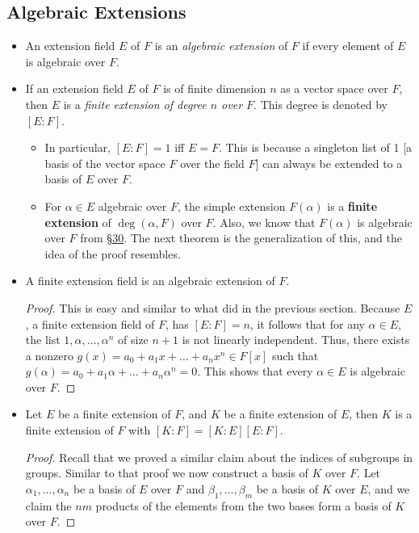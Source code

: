 \documentclass[11pt]{article}
\newcommand{\lk}[2]{\hyperlink{subsection.#1.#2}{\S#2}} %
\newcommand{\df}[1]{\textit{\textsf{#1}}}
\begin{document}
\subsection{Algebraic Extensions}
\begin{itemize}
    \item An extension field $E$ of $F$ is an \df{algebraic extension} of $F$ if every element of $E$ is algebraic over $F$.
    \item If an extension field $E$ of $F$ is of finite dimension $n$ as a vector space over $F$, then $E$ is a \df{finite extension of degree $n$ over $F$}. This degree is denoted by $[E:F]$.
    \begin{itemize}
         \item In particular, $[E:F] = 1$ iff $E = F$. This is because a singleton list of 1 [a basis of the vector space $F$ over the field $F$] can always be extended to a basis of $E$ over $F$.
        \item For $\alpha \in E$ algebraic over $F$, the simple extension $F(\alpha)$ is a \textbf{finite extension} of $\deg(\alpha,F)$ over $F$. Also, we know that $F(\alpha)$ is algebraic over $F$ from \lk{6}{30}. The next theorem is the generalization of this, and the idea of the proof resembles.
    \end{itemize}
    \item A finite extension field is an algebraic extension of $F$.
    \begin{proof}
        This is easy and similar to what did in the previous section. Because $E$, a finite extension field of $F$, has $[E:F] = n$, it follows that for any $\alpha \in E$, the list $1, \alpha, \dots, \alpha^n$ of size $n+1$ is not linearly independent. Thus, there exists a nonzero $g(x) = a_0 + a_1 x+ \dots + a_n x^n \in F[x]$ such that $g(\alpha) = a_0 + a_1 \alpha + \dots +a_n \alpha^n = 0$. This shows that every $\alpha \in E$ is algebraic over $F$.
    \end{proof}
    \item Let $E$ be a finite extension of $F$, and $K$ be a finite extension of $E$, then $K$ is a finite extension of $F$ with $[K:F] = [K:E][E:F]$. 
    \begin{proof}
        Recall that we proved a similar claim about the indices of subgroups in groups. Similar to that proof we now construct a basis of $K$ over $F$. Let $\alpha_1,\dots,\alpha_n$ be a basis of $E$ over $F$ and $\beta_1,\dots,\beta_m$ be a basis of $K$ over $E$, and we claim the $nm$ products of the elements from the two bases form a basis of $K$ over $F$.
        

\end{proof}
\end{itemize}
\end{document}
